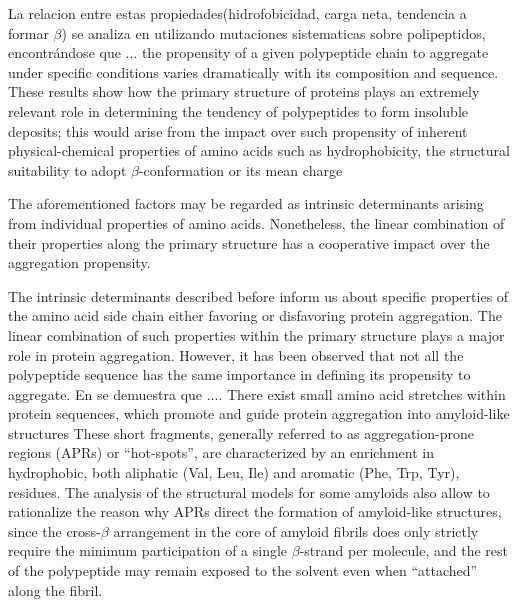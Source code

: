La relacion entre estas propiedades(hidrofobicidad, carga neta, tendencia a formar $\beta$) se analiza en  \cite{chiti2003rationalization} utilizando mutaciones sistematicas sobre polipeptidos,
encontrándose que ... the propensity of a  given  polypeptide  chain  to  aggregate  under  specific  conditions varies  dramatically  with  its  composition  and  sequence.
These results show how the primary structure of proteins plays an extremely relevant role in determining the tendency of polypeptides to form insoluble deposits;
this would arise from the impact over such propensity of inherent physical-chemical properties of amino acids such as hydrophobicity, the
structural suitability to adopt $\beta$-conformation or its mean charge

The aforementioned factors may be regarded as intrinsic determinants arising
from individual properties of amino acids. Nonetheless, the linear combination
of their properties along the primary structure has a cooperative impact over the
aggregation propensity. 




The intrinsic determinants described before inform us about specific properties of the amino acid side chain either favoring or disfavoring protein aggregation.
The linear combination of such properties within the primary structure plays a major role in protein aggregation.
However, it has been observed that not all the polypeptide sequence has the same importance in defining its propensity to aggregate. 
En \cite{ventura2004short} se demuestra que ....
There exist small amino acid stretches within protein sequences, which promote and guide protein aggregation into amyloid-like structures
These short fragments, generally referred to as aggregation-prone regions (APRs) or “hot-spots”, are characterized by an enrichment in hydrophobic, both aliphatic (Val, Leu,
Ile) and aromatic (Phe, Trp, Tyr), residues.
The analysis of the structural models for some amyloids also allow to rationalize the reason why APRs direct the formation of amyloid-like structures, since the cross-$\beta$ arrangement in the core of
amyloid fibrils does only strictly require the minimum participation of a single $\beta$-strand per molecule, and the rest of the polypeptide may remain exposed to the
solvent even when “attached” along the fibril.

